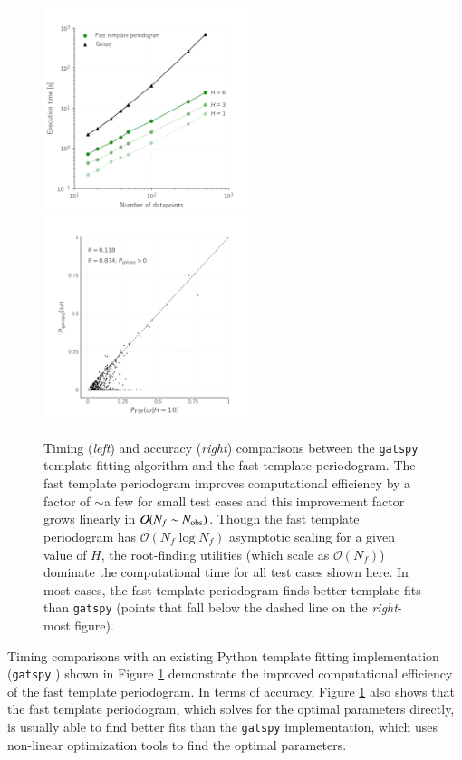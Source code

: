 \documentclass{webofc}
\newcommand{\bigO}{\mathcal{O}}
\begin{document}
\begin{figure}
\centering

\includegraphics[width=6cm,clip]{../plots/timing_vs_ndata.png}
\includegraphics[width=6cm,clip]{../plots/correlation_with_gatspy.png}
\caption{Timing (\emph{left}) and accuracy (\emph{right}) comparisons between the \texttt{gatspy} \cite{gatspy} template fitting algorithm 
and the fast template periodogram. The fast template periodogram improves computational efficiency by a factor of $\sim$a few for small test cases
and this improvement factor grows linearly in $\bigO(N_f\sim N_{\rm obs})$. Though the fast template periodogram has $\bigO(N_f\log N_f)$ asymptotic scaling for a given value of $H$, the root-finding utilities (which scale as $\bigO(N_f)$) dominate the computational time for all test cases shown here. In most cases, the fast template periodogram finds better template fits than \texttt{gatspy} (points that fall below the dashed line on the \emph{right}-most figure).}
\label{fig:timingacc}
\end{figure}

Timing comparisons with an existing Python template fitting implementation (\texttt{gatspy} \cite{gatspy}) shown in Figure \ref{fig:timingacc}
demonstrate the improved computational efficiency of the fast template periodogram. In terms of accuracy, Figure \ref{fig:timingacc} also
shows that the fast template periodogram, which solves for the optimal parameters directly, is usually able to find better
fits than the \texttt{gatspy} implementation, which uses non-linear optimization tools to find the optimal parameters. 
\end{document}
